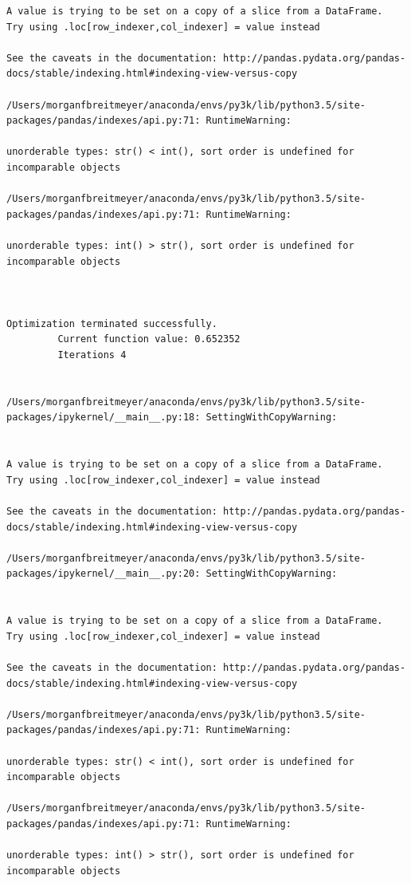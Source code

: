\begin{lstlisting}
A value is trying to be set on a copy of a slice from a DataFrame.
Try using .loc[row_indexer,col_indexer] = value instead

See the caveats in the documentation: http://pandas.pydata.org/pandas-docs/stable/indexing.html#indexing-view-versus-copy

/Users/morganfbreitmeyer/anaconda/envs/py3k/lib/python3.5/site-packages/pandas/indexes/api.py:71: RuntimeWarning:

unorderable types: str() < int(), sort order is undefined for incomparable objects

/Users/morganfbreitmeyer/anaconda/envs/py3k/lib/python3.5/site-packages/pandas/indexes/api.py:71: RuntimeWarning:

unorderable types: int() > str(), sort order is undefined for incomparable objects



Optimization terminated successfully.
         Current function value: 0.652352
         Iterations 4


/Users/morganfbreitmeyer/anaconda/envs/py3k/lib/python3.5/site-packages/ipykernel/__main__.py:18: SettingWithCopyWarning:


A value is trying to be set on a copy of a slice from a DataFrame.
Try using .loc[row_indexer,col_indexer] = value instead

See the caveats in the documentation: http://pandas.pydata.org/pandas-docs/stable/indexing.html#indexing-view-versus-copy

/Users/morganfbreitmeyer/anaconda/envs/py3k/lib/python3.5/site-packages/ipykernel/__main__.py:20: SettingWithCopyWarning:


A value is trying to be set on a copy of a slice from a DataFrame.
Try using .loc[row_indexer,col_indexer] = value instead

See the caveats in the documentation: http://pandas.pydata.org/pandas-docs/stable/indexing.html#indexing-view-versus-copy

/Users/morganfbreitmeyer/anaconda/envs/py3k/lib/python3.5/site-packages/pandas/indexes/api.py:71: RuntimeWarning:

unorderable types: str() < int(), sort order is undefined for incomparable objects

/Users/morganfbreitmeyer/anaconda/envs/py3k/lib/python3.5/site-packages/pandas/indexes/api.py:71: RuntimeWarning:

unorderable types: int() > str(), sort order is undefined for incomparable objects




\end{lstlisting}
